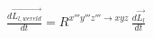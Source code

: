 \begin{align*}
&\frac{d\overrightarrow{L_{l,wereld}}}{dt}=R^{x'''y'''z''' \rightarrow xyz}\,\frac{d\overrightarrow{L_{l}}}{dt}\\
\end{align*}

